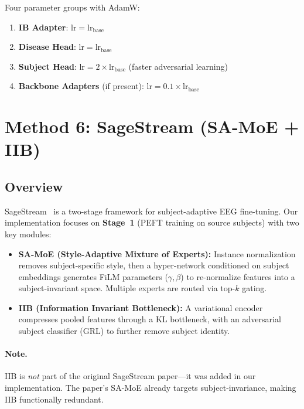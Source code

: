 \documentclass{article}
\begin{document}
Four parameter groups with AdamW:
\begin{enumerate}
\item \textbf{IB Adapter}: $\text{lr} = \text{lr}_\text{base}$
\item \textbf{Disease Head}: $\text{lr} = \text{lr}_\text{base}$
\item \textbf{Subject Head}: $\text{lr} = 2 \times \text{lr}_\text{base}$ (faster adversarial learning)
\item \textbf{Backbone Adapters} (if present): $\text{lr} = 0.1 \times \text{lr}_\text{base}$
\end{enumerate}

\section{Method 6: SageStream (SA-MoE + IIB)}
\label{sec:sagestream}

\subsection{Overview}

SageStream~\cite{chen2025sagestream} is a two-stage framework for subject-adaptive EEG fine-tuning. Our implementation focuses on \textbf{Stage~1} (PEFT training on source subjects) with two key modules:
\begin{itemize}
\item \textbf{SA-MoE (Style-Adaptive Mixture of Experts):} Instance normalization removes subject-specific style, then a hyper-network conditioned on subject embeddings generates FiLM parameters ($\gamma, \beta$) to re-normalize features into a subject-invariant space. Multiple experts are routed via top-$k$ gating.
\item \textbf{IIB (Information Invariant Bottleneck):} A variational encoder compresses pooled features through a KL bottleneck, with an adversarial subject classifier (GRL) to further remove subject identity.
\end{itemize}

\paragraph{Note.} IIB is \emph{not} part of the original SageStream paper---it was added in our implementation. The paper's SA-MoE already targets subject-invariance, making IIB functionally redundant.
\end{document}
